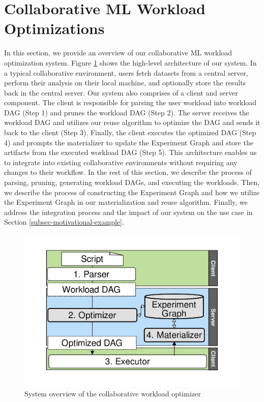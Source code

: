 \section{Collaborative ML Workload Optimizations} \label{sec-ml-workloads}
In this section, we provide an overview of our collaborative ML workload optimization system.
Figure \ref{system-workflow} shows the high-level architecture of our system.
In a typical collaborative environment, users fetch datasets from a central server, perform their analysis on their local machine, and optionally store the results back in the central server.
Our system also comprises of a client and server component.
The client is responsible for parsing the user workload into workload DAG (Step 1) and prunes the workload DAG (Step 2).
The server receives the workload DAG and utilizes our reuse algorithm to optimize the DAG and sends it back to the client (Step 3).
Finally, the client executes the optimized DAG (Step 4) and prompts the materializer to update the Experiment Graph and store the artifacts from the executed workload DAG (Step 5).
This architecture enables us to integrate into existing collaborative environments without requiring any changes to their workflow.
In the rest of this section, we describe the process of parsing, pruning, generating workload DAGs, and executing the workloads.
Then, we describe the process of constructing the Experiment Graph and how we utilize the Experiment Graph in our materialization and reuse algorithm. 
Finally, we address the integration process and the impact of our system on the use case in Section \ref{subsec-motivational-example}.

\begin{figure}
\centering
\includegraphics[width=0.8\columnwidth]{../images/system-workflow}
\caption{System overview of the collaborative workload optimizer}
\label{system-workflow}
\end{figure}

